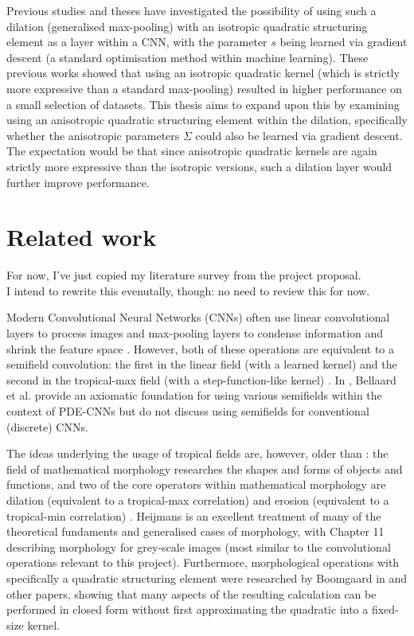 \documentclass[a4paper, 12pt]{report}
\def\comment#1{\color{red}#1\color{black}}
\begin{document}
Previous studies \cite{groenendijk2022morphpool} and theses \cite{thierrybsc, koenbsc} have investigated the possibility of using such a dilation (generalised max-pooling) with an isotropic quadratic structuring element as a layer within a CNN, with the parameter $s$ being learned via gradient descent (a standard optimisation method within machine learning). These previous works showed that using an isotropic quadratic kernel (which is strictly more expressive than a standard max-pooling) resulted in higher performance on a small selection of datasets. This thesis aims to expand upon this by examining using an anisotropic quadratic structuring element within the dilation, specifically whether the anisotropic parameters $\Sigma$ could also be learned via gradient descent. The expectation would be that since anisotropic quadratic kernels are again strictly more expressive than the isotropic versions, such a dilation layer would further improve performance.

\newpage
\section{Related work}
\comment{For now, I've just copied my literature survey from the project proposal.\\ I intend to rewrite this evenutally, though: no need to review this for now.}

Modern Convolutional Neural Networks (CNNs) often use linear convolutional layers to process images and max-pooling layers to condense information and shrink the feature space \cite{introconvnets}. However, both of these operations are equivalent to a semifield convolution: the first in the linear field (with a learned kernel) and the second in the tropical-max field (with a step-function-like kernel) \cite{bellaardaxiomatic}. In \cite{bellaardaxiomatic}, Bellaard et al. provide an axiomatic foundation for using various semifields within the context of PDE-CNNs but do not discuss using semifields for conventional (discrete) CNNs. 

The ideas underlying the usage of tropical fields are, however, older than \cite{bellaardaxiomatic}: the field of mathematical morphology researches the shapes and forms of objects and functions, and two of the core operators within mathematical morphology are dilation (equivalent to a tropical-max correlation) and erosion (equivalent to a tropical-min correlation) \cite{maragos}. Heijmans \cite{heijmans1996morphological} is an excellent treatment of many of the theoretical fundaments and generalised cases of morphology, with Chapter 11 describing morphology for grey-scale images (most similar to the convolutional operations relevant to this project). Furthermore, morphological operations with specifically a quadratic structuring element were researched by Boomgaard in \cite{Boomgaard1999NumericalSS} and other papers, showing that many aspects of the resulting calculation can be performed in closed form without first approximating the quadratic into a fixed-size kernel.
\end{document}
